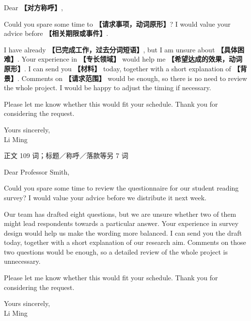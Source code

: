 \documentclass[11pt,a4paper,fontset=macnew]{ctexart}
\newenvironment{writing}{\begingroup\fontsize{10.5}{13.5}\selectfont\setlength{\parskip}{3pt}}{\par\endgroup}
\newenvironment{example}{\begingroup\fontsize{11}{14.3}\selectfont\setlength{\parskip}{4pt}}{\par\endgroup}
\begin{document}
\begin{writing}
\noindent Dear {\bfseries 【对方称呼】},\par
Could you spare some time to {\bfseries 【请求事项，动词原形】}? I would value your advice before {\bfseries 【相关期限或事件】}.

I have already {\bfseries 【已完成工作，过去分词短语】}, but I am unsure about {\bfseries 【具体困难】}. Your experience in {\bfseries 【专长领域】} would help me {\bfseries 【希望达成的效果，动词原形】}. I can send you {\bfseries 【材料】} today, together with a short explanation of {\bfseries 【背景】}. Comments on {\bfseries 【请求范围】} would be enough, so there is no need to review the whole project. I would be happy to adjust the timing if necessary.

Please let me know whether this would fit your schedule. Thank you for considering the request.

\noindent Yours sincerely,\\Li Ming\par
\end{writing}
\par\vspace{4pt}{\bfseries 完整套用示例}\par\nopagebreak
{\small 正文 109 词；标题／称呼／落款等另 7 词}\par
\begin{example}
\noindent Dear Professor Smith,\par
Could you spare some time to review the questionnaire for our student reading survey? I would value your advice before we distribute it next week.

Our team has drafted eight questions, but we are unsure whether two of them might lead respondents towards a particular answer. Your experience in survey design would help us make the wording more balanced. I can send you the draft today, together with a short explanation of our research aim. Comments on those two questions would be enough, so a detailed review of the whole project is unnecessary.

Please let me know whether this would fit your schedule. Thank you for considering the request.

\noindent Yours sincerely,\\Li Ming\par
\end{example}
\par\vspace{4pt}{\bfseries 好词好句：优先记这三处}\par\nopagebreak
\end{document}
